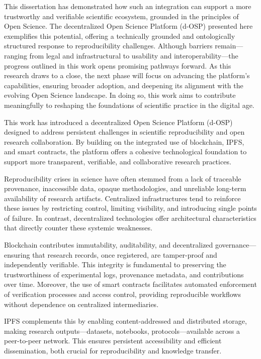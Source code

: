 \documentclass[final]{rc-book-2.14}
\begin{document}
This dissertation has demonstrated how such an integration can support a more trustworthy and verifiable scientific ecosystem, grounded in the principles of Open Science. The decentralized Open Science Platform (d-OSP) presented here exemplifies this potential, offering a technically grounded and ontologically structured response to reproducibility challenges. Although barriers remain—ranging from legal and infrastructural to usability and interoperability—the progress outlined in this work opens promising pathways forward. As this research draws to a close, the next phase will focus on advancing the platform's capabilities, ensuring broader adoption, and deepening its alignment with the evolving Open Science landscape. In doing so, this work aims to contribute meaningfully to reshaping the foundations of scientific practice in the digital age.

This work has introduced a decentralized Open Science Platform (d-OSP) designed to address persistent challenges in scientific reproducibility and open research collaboration. By building on the integrated use of blockchain, IPFS, and smart contracts, the platform offers a cohesive technological foundation to support more transparent, verifiable, and collaborative research practices.

Reproducibility crises in science have often stemmed from a lack of traceable provenance, inaccessible data, opaque methodologies, and unreliable long-term availability of research artifacts. Centralized infrastructures tend to reinforce these issues by restricting control, limiting visibility, and introducing single points of failure. In contrast, decentralized technologies offer architectural characteristics that directly counter these systemic weaknesses.

Blockchain contributes immutability, auditability, and decentralized governance—ensuring that research records, once registered, are tamper-proof and independently verifiable. This integrity is fundamental to preserving the trustworthiness of experimental logs, provenance metadata, and contributions over time. Moreover, the use of smart contracts facilitates automated enforcement of verification processes and access control, providing reproducible workflows without dependence on centralized intermediaries.

IPFS complements this by enabling content-addressed and distributed storage, making research outputs—datasets, notebooks, protocols—available across a peer-to-peer network. This ensures persistent accessibility and efficient dissemination, both crucial for reproducibility and knowledge transfer.
\end{document}
